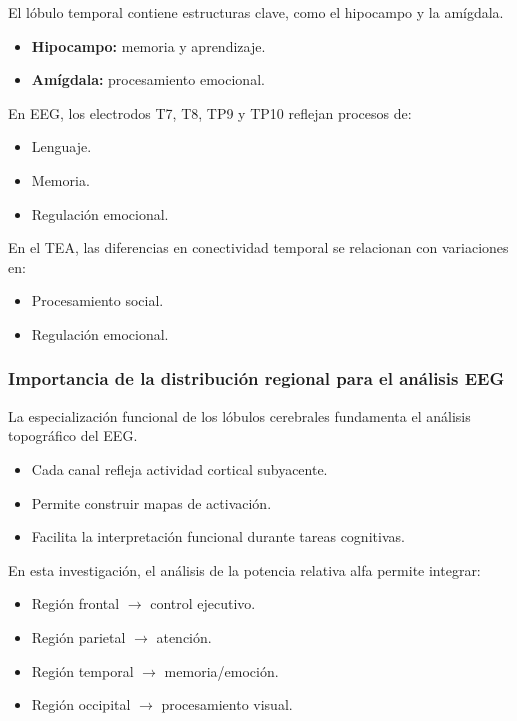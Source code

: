 \documentclass{book}
\begin{document}
El lóbulo temporal contiene estructuras clave, como el hipocampo y la amígdala.

\begin{itemize}
    \item \textbf{Hipocampo:} memoria y aprendizaje.
    \item \textbf{Amígdala:} procesamiento emocional.
\end{itemize}

En EEG, los electrodos T7, T8, TP9 y TP10 reflejan procesos de:

\begin{itemize}
    \item Lenguaje.
    \item Memoria.
    \item Regulación emocional.
\end{itemize}

En el TEA, las diferencias en conectividad temporal se relacionan con variaciones en:

\begin{itemize}
    \item Procesamiento social.
    \item Regulación emocional.
\end{itemize}

\subsubsection*{Importancia de la distribución regional para el análisis EEG}

La especialización funcional de los lóbulos cerebrales fundamenta el análisis topográfico del EEG.

\begin{itemize}
    \item Cada canal refleja actividad cortical subyacente.
    \item Permite construir mapas de activación.
    \item Facilita la interpretación funcional durante tareas cognitivas.
\end{itemize}

En esta investigación, el análisis de la potencia relativa alfa permite integrar:

\begin{itemize}
    \item Región frontal $\rightarrow$ control ejecutivo.
    \item Región parietal $\rightarrow$ atención.
    \item Región temporal $\rightarrow$ memoria/emoción.
    \item Región occipital $\rightarrow$ procesamiento visual.
\end{itemize}
\end{document}
